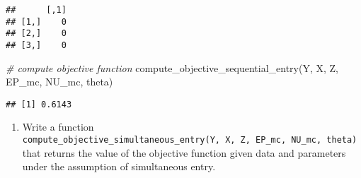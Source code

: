 \documentclass[
]{article}
\newenvironment{Shaded}{\begin{snugshade}}{\end{snugshade}}
\newcommand{\CommentTok}[1]{\textcolor[rgb]{0.56,0.35,0.01}{\textit{#1}}}
\newcommand{\FunctionTok}[1]{\textcolor[rgb]{0.00,0.00,0.00}{#1}}
\newcommand{\NormalTok}[1]{#1}
\providecommand{\tightlist}{%
  \setlength{\itemsep}{0pt}\setlength{\parskip}{0pt}}
\begin{document}
\begin{verbatim}
##      [,1]
## [1,]    0
## [2,]    0
## [3,]    0
\end{verbatim}

\begin{Shaded}
\begin{Highlighting}[]
\CommentTok{\# compute objective function}
\FunctionTok{compute\_objective\_sequential\_entry}\NormalTok{(Y, X, Z, EP\_mc, NU\_mc, theta)}
\end{Highlighting}
\end{Shaded}

\begin{verbatim}
## [1] 0.6143
\end{verbatim}

\begin{enumerate}
\def\labelenumi{\arabic{enumi}.}
\setcounter{enumi}{2}
\tightlist
\item
  Write a function
  \texttt{compute\_objective\_simultaneous\_entry(Y,\ X,\ Z,\ EP\_mc,\ NU\_mc,\ theta)}
  that returns the value of the objective function given data and
  parameters under the assumption of simultaneous entry.
\end{enumerate}
\end{document}
